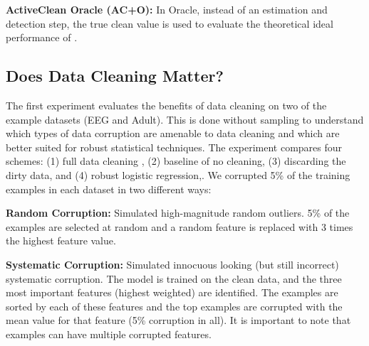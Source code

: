 \vspace{0.25em}

\noindent\textbf{ActiveClean Oracle (AC+O): } In \sys Oracle, instead of an estimation and detection step, the true clean value is used to evaluate the theoretical ideal performance of \sys.

\subsection{Does Data Cleaning Matter?}
The first experiment evaluates the benefits of data cleaning on two of the example datasets (EEG and Adult).
This is done without sampling to understand which types of data corruption are amenable to data cleaning and which are better suited for robust statistical techniques.
The experiment compares four schemes: (1) full data cleaning  , (2) baseline of no cleaning, (3) discarding the dirty data, and (4) robust logistic regression,. We corrupted 5\% of the training examples in each dataset in two different ways:

\vspace{0.5em}

\noindent\textbf{Random Corruption: } Simulated high-magnitude random outliers. 5\% of the examples are selected at random and a random feature is replaced with 3 times the highest feature value.

\vspace{0.5em}

\noindent\textbf{Systematic Corruption: } Simulated innocuous looking (but still incorrect) systematic corruption. The model is trained on the clean data, and the three most important features (highest weighted) are identified. The examples are sorted by each of these features and the top examples are corrupted with the mean value for that feature (5\% corruption in all). 
It is important to note that examples can have multiple corrupted features.

